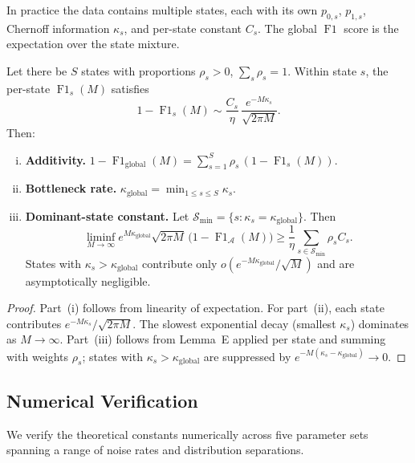 In practice the data contains multiple states, each with its own
$p_{0,s}$, $p_{1,s}$, Chernoff information $\kappa_s$, and per-state
constant $C_s$.  The global $\operatorname{F1}$ score is the expectation
over the state mixture.

\begin{lemma}
  \label{lem:aggregation}
  Let there be $S$ states with proportions $\rho_s>0$, $\sum_s\rho_s=1$.
  Within state $s$, the per-state $\operatorname{F1}_s(M)$ satisfies
  \[
  1-\operatorname{F1}_s(M)
  \sim \frac{C_s}{\eta}\,
       \frac{e^{-M\kappa_s}}{\sqrt{2\pi M}}.
  \]
  Then:
  \begin{enumerate}[(i)]
    \item \textbf{Additivity.}
      $\displaystyle
      1-\operatorname{F1}_{\text{global}}(M)
      = \sum_{s=1}^S \rho_s\,(1-\operatorname{F1}_s(M))$.
    \item \textbf{Bottleneck rate.}
      $\displaystyle
      \kappa_{\text{global}} = \min_{1\le s\le S} \kappa_s$.
    \item \textbf{Dominant-state constant.}
      Let $\mathcal{S}_{\min}=\{s:\kappa_s=\kappa_{\text{global}}\}$.  Then
      \[
      \liminf_{M\to\infty}
        e^{M\kappa_{\text{global}}}\sqrt{2\pi M}\,
        \bigl(1-\operatorname{F1}_{\mathcal{A}}(M)\bigr)
      \ge \frac1\eta\sum_{s\in\mathcal{S}_{\min}} \rho_s C_s.
      \]
      States with $\kappa_s>\kappa_{\text{global}}$ contribute only
      $o(e^{-M\kappa_{\text{global}}}/\sqrt{M})$ and are asymptotically
      negligible.
  \end{enumerate}
\end{lemma}

\begin{proof}
  Part~(i) follows from linearity of expectation.  For part~(ii), each state
  contributes $e^{-M\kappa_s}/\sqrt{2\pi M}$.  The slowest exponential decay
  (smallest $\kappa_s$) dominates as $M\to\infty$.  Part~(iii) follows from
  Lemma~E applied per state and summing with weights $\rho_s$; states with
  $\kappa_s>\kappa_{\text{global}}$ are suppressed by
  $e^{-M(\kappa_s-\kappa_{\text{global}})}\to0$.
\end{proof}

\subsection{Numerical Verification}
\label{sec:thm4_numerical}

We verify the theoretical constants numerically across five parameter sets
spanning a range of noise rates and distribution separations.

